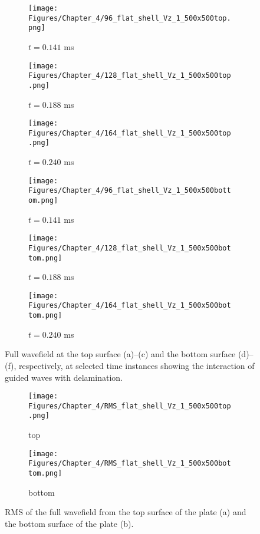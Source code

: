 \begin{figure} [h!]
	\centering
	\begin{subfigure}[b]{0.32\textwidth}
		\centering
		\texttt{[image: Figures/Chapter\_4/96\_flat\_shell\_Vz\_1\_500x500top.png]}
		\caption{\(t=0.141\) ms}
		\label{fig:frame96top}
	\end{subfigure}
	\hfill
	\begin{subfigure}[b]{0.32\textwidth}
		\centering
		\texttt{[image: Figures/Chapter\_4/128\_flat\_shell\_Vz\_1\_500x500top.png]}
		\caption{\(t=0.188\) ms}
		\label{fig:frame128top}
	\end{subfigure}
	\hfill
	\begin{subfigure}[b]{0.32\textwidth}
		\centering
		\texttt{[image: Figures/Chapter\_4/164\_flat\_shell\_Vz\_1\_500x500top.png]}
		\caption{\(t=0.240\) ms}
		\label{fig:frame164top}
	\end{subfigure}	
	\hfill
	\begin{subfigure}[b]{0.32\textwidth}
		\centering
		\texttt{[image: Figures/Chapter\_4/96\_flat\_shell\_Vz\_1\_500x500bottom.png]}
		\caption{\(t=0.141\) ms}
		\label{fig:frame96bottom}
	\end{subfigure}
	\hfill
	\begin{subfigure}[b]{0.32\textwidth}
		\centering
		\texttt{[image: Figures/Chapter\_4/128\_flat\_shell\_Vz\_1\_500x500bottom.png]}
		\caption{\(t=0.188\) ms}
		\label{fig:frame128bottom}
	\end{subfigure}
	\hfill
	\begin{subfigure}[b]{0.32\textwidth}
		\centering
		\texttt{[image: Figures/Chapter\_4/164\_flat\_shell\_Vz\_1\_500x500bottom.png]}
		\caption{\(t=0.240\) ms}
		\label{fig:frame164bottom}
	\end{subfigure}
	
	\caption{Full wavefield at the top surface (a)--(c) and the bottom surface (d)--(f), respectively, at selected time instances showing the interaction of guided waves with delamination.}
	\label{fig:wavefield}
\end{figure} 

\begin{figure} [h!]
	\centering
	\begin{subfigure}[b]{0.47\textwidth}
		\centering
		\texttt{[image: Figures/Chapter\_4/RMS\_flat\_shell\_Vz\_1\_500x500top.png]}
		\caption{top}
		\label{fig:rmstop}
	\end{subfigure}
	\hfill
	\begin{subfigure}[b]{0.47\textwidth}
		\centering
		\texttt{[image: Figures/Chapter\_4/RMS\_flat\_shell\_Vz\_1\_500x500bottom.png]}
		\caption{bottom}
		\label{fig:rmsbottom}
	\end{subfigure}
	\caption{RMS of the full wavefield from the top surface of the plate (a) and the bottom surface of the plate (b).}
	\label{fig:rms}
\end{figure} 
\newpage